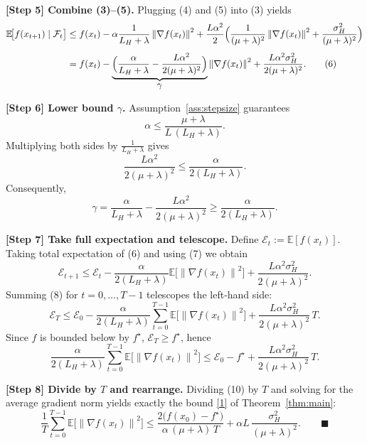 \documentclass{article}
\newcommand{\E}{\mathbb{E}}
\newcommand{\norm}[1]{\left\lVert #1 \right\rVert}
\begin{document}
\noindent\textbf{[Step 5] Combine (3)–(5).}  
Plugging (4) and (5) into (3) yields
\begin{align}
\E\!\bigl[f(x_{t+1})\mid\mathcal{F}_{t}\bigr]
&\le f(x_{t})
-\alpha\frac{1}{L_{H}+\lambda}\norm{\nabla f(x_{t})}^{2}
+\frac{L\alpha^{2}}{2}\Bigl(\frac{1}{(\mu+\lambda)^{2}}\norm{\nabla f(x_{t})}^{2}
+\frac{\sigma_{H}^{2}}{(\mu+\lambda)^{2}}\Bigr) \nonumber\\[4pt]
&= f(x_{t})
-\underbrace{\Bigl(\frac{\alpha}{L_{H}+\lambda}
-\frac{L\alpha^{2}}{2(\mu+\lambda)^{2}}\Bigr)}_{\displaystyle\gamma}
   \norm{\nabla f(x_{t})}^{2}
+\frac{L\alpha^{2}\sigma_{H}^{2}}{2(\mu+\lambda)^{2}} .
\tag{6}
\end{align}

\noindent\textbf{[Step 6] Lower bound $\gamma$.}  
Assumption~\ref{ass:stepsize} guarantees
\[
\alpha\le \frac{\mu+\lambda}{L\,(L_{H}+\lambda)} .
\]
Multiplying both sides by $\frac{1}{L_{H}+\lambda}$ gives
\[
\frac{L\alpha^{2}}{2(\mu+\lambda)^{2}}
\le \frac{\alpha}{2(L_{H}+\lambda)} .
\]
Consequently,
\[
\gamma
= \frac{\alpha}{L_{H}+\lambda}-\frac{L\alpha^{2}}{2(\mu+\lambda)^{2}}
\ge \frac{\alpha}{2(L_{H}+\lambda)} .
\tag{7}
\]

\noindent\textbf{[Step 7] Take full expectation and telescope.}  
Define $\mathcal{E}_{t}:=\E[f(x_{t})]$.  Taking total expectation of (6) and using (7) we obtain
\[
\mathcal{E}_{t+1}
\le \mathcal{E}_{t}
-\frac{\alpha}{2(L_{H}+\lambda)}\E\!\bigl[\norm{\nabla f(x_{t})}^{2}\bigr]
+\frac{L\alpha^{2}\sigma_{H}^{2}}{2(\mu+\lambda)^{2}} .
\tag{8}
\]
Summing (8) for $t=0,\dots,T-1$ telescopes the left‑hand side:
\[
\mathcal{E}_{T}\le \mathcal{E}_{0}
-\frac{\alpha}{2(L_{H}+\lambda)}\sum_{t=0}^{T-1}\E\!\bigl[\norm{\nabla f(x_{t})}^{2}\bigr]
+\frac{L\alpha^{2}\sigma_{H}^{2}}{2(\mu+\lambda)^{2}}\,T .
\tag{9}
\]
Since $f$ is bounded below by $f^{\star}$, $\mathcal{E}_{T}\ge f^{\star}$, hence
\[
\frac{\alpha}{2(L_{H}+\lambda)}\sum_{t=0}^{T-1}\E\!\bigl[\norm{\nabla f(x_{t})}^{2}\bigr]
\le \mathcal{E}_{0}-f^{\star}
+\frac{L\alpha^{2}\sigma_{H}^{2}}{2(\mu+\lambda)^{2}}\,T .
\tag{10}
\]

\noindent\textbf{[Step 8] Divide by $T$ and rearrange.}  
Dividing (10) by $T$ and solving for the average gradient norm yields exactly the bound \eqref{1} of Theorem~\ref{thm:main}:
\[
\frac{1}{T}\sum_{t=0}^{T-1}\E\!\bigl[\norm{\nabla f(x_{t})}^{2}\bigr]
\le
\frac{2\bigl(f(x_{0})-f^{\star}\bigr)}{\alpha\,(\mu+\lambda)\,T}
+\alpha L\,\frac{\sigma_{H}^{2}}{(\mu+\lambda)^{2}} .
\qquad\blacksquare
\]
\end{document}
